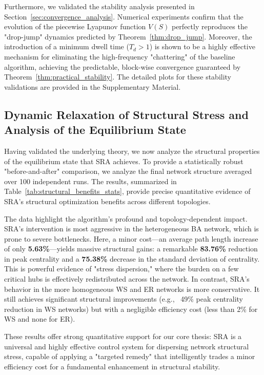 \documentclass[journal]{IEEEtran}
\begin{document}
Furthermore, we validated the stability analysis presented in Section~\ref{sec:convergence_analysis}. Numerical experiments confirm that the evolution of the piecewise Lyapunov function $V(S)$ perfectly reproduces the "drop-jump" dynamics predicted by Theorem~\ref{thm:drop_jump}. Moreover, the introduction of a minimum dwell time ($T_d>1$) is shown to be a highly effective mechanism for eliminating the high-frequency "chattering" of the baseline algorithm, achieving the predictable, block-wise convergence guaranteed by Theorem~\ref{thm:practical_stability}. The detailed plots for these stability validations are provided in the Supplementary Material.

\subsection{Dynamic Relaxation of Structural Stress and Analysis of the Equilibrium State}
\label{subsec:dynamic_relaxation}

Having validated the underlying theory, we now analyze the structural properties of the equilibrium state that SRA achieves. To provide a statistically robust "before-and-after" comparison, we analyze the final network structure averaged over 100 independent runs. The results, summarized in Table~\ref{tab:structural_benefits_stats}, provide precise quantitative evidence of SRA's structural optimization benefits across different topologies.

The data highlight the algorithm's profound and topology-dependent impact. SRA's intervention is most aggressive in the heterogeneous BA network, which is prone to severe bottlenecks. Here, a minor cost—an average path length increase of only \textbf{5.63\%}—yields massive structural gains: a remarkable \textbf{83.76\%} reduction in peak centrality and a \textbf{75.38\%} decrease in the standard deviation of centrality. This is powerful evidence of "stress dispersion," where the burden on a few critical hubs is effectively redistributed across the network. In contrast, SRA's behavior in the more homogeneous WS and ER networks is more conservative. It still achieves significant structural improvements (e.g., ~49\% peak centrality reduction in WS networks) but with a negligible efficiency cost (less than 2\% for WS and none for ER).

These results offer strong quantitative support for our core thesis: SRA is a universal and highly effective control system for dispersing network structural stress, capable of applying a "targeted remedy" that intelligently trades a minor efficiency cost for a fundamental enhancement in structural stability.
\end{document}
